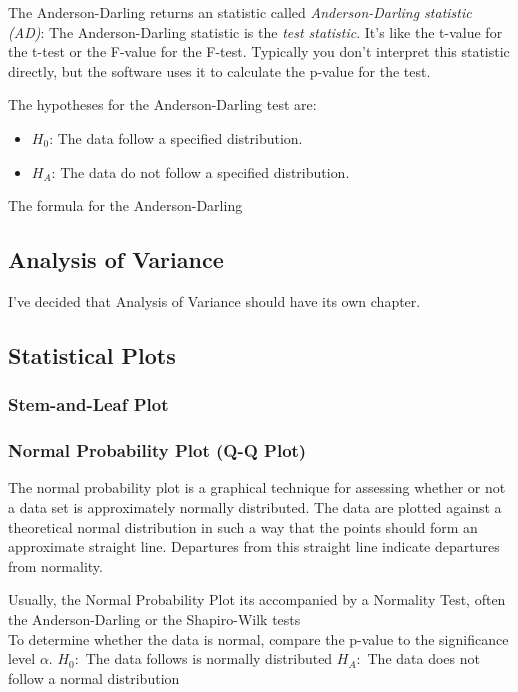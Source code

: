 \documentclass[11pt]{article}
\begin{document}
The Anderson-Darling returns an statistic called \emph{Anderson-Darling
statistic (AD)}: The Anderson-Darling statistic is the \emph{test
statistic}. It's like the t-value for the t-test or the F-value for the
F-test. Typically you don't interpret this statistic directly, but the
software uses it to calculate the p-value for the test.

The hypotheses for the Anderson-Darling test are:
\begin{itemize}
  \item \(H_0\): The data follow a specified distribution.
  \item \(H_A\): The data do not follow a specified distribution.
\end{itemize}


The formula for the Anderson-Darling
\hypertarget{analysis-of-variance}{%
\subsection{Analysis of Variance}\label{analysis-of-variance}}
I've decided that Analysis of Variance should have its own chapter.


\hypertarget{statistical-plots}{%
\subsection{Statistical Plots}\label{statistical-plots}}

\hypertarget{stem-and-leaf-plot}{%
\subsubsection{Stem-and-Leaf Plot}\label{stem-and-leaf-plot}}

\hypertarget{normal-probability-plot-q-q-plot}{%
\subsubsection{Normal Probability Plot (Q-Q
Plot)}\label{normal-probability-plot-q-q-plot}}

The normal probability plot is a graphical technique for assessing
whether or not a data set is approximately normally distributed. The
data are plotted against a theoretical normal distribution in such a way
that the points should form an approximate straight line. Departures
from this straight line indicate departures from normality.

Usually, the Normal Probability Plot its accompanied by a Normality
Test, often the Anderson-Darling or the Shapiro-Wilk tests\\
To determine whether the data is normal, compare the p-value to the
significance level \(\alpha\). \(H_0:\) The data follows is normally
distributed \(H_A:\) The data does not follow a normal distribution
\end{document}
